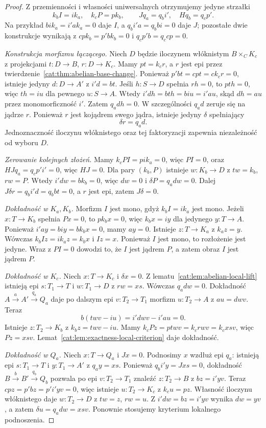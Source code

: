 \begin{proof}
Z przemienności i własności uniwersalnych otrzymujemy jedyne strzałki
\[
k_b I=i k_a,\quad k_c P=p k_b,\qquad
Jq_a=q_b i',\quad Hq_b=q_c p'.
\]
Na przykład $bi k_a=i'a k_a=0$ daje $I$, a $q_b i'a=q_b bi=0$ daje $J$; pozostałe dwie konstrukcje wynikają z $cp k_b=p'b k_b=0$ i $q_cp'b=q_ccp=0$.

\emph{Konstrukcja morfizmu łączącego.}
Niech $D$ będzie iloczynem włóknistym $B\times_C K_c$ z projekcjami $t:D\to B$, $r:D\to K_c$. Mamy $pt=k_cr$, a $r$ jest epi przez twierdzenie~\ref{cat:thm:abelian-base-change}. Ponieważ $p'bt=cpt=ck_cr=0$, istnieje jedyny $d:D\to A'$ z $i'd=bt$. Jeśli $h:S\to D$ spełnia $rh=0$, to $pth=0$, więc $th=iu$ dla pewnego $u:S\to A$. Wtedy $i'dh=bth=biu=i'au$, skąd $dh=au$ przez monomorficzność $i'$. Zatem $q_a dh=0$. W szczególności $q_a d$ zeruje się na jądrze $r$. Ponieważ $r$ jest kojądrem swego jądra, istnieje jedyny $\delta$ spełniający
\begin{equation}\label{cat:eq:snake-connecting}
\delta r=q_a d.
\end{equation}
Jednoznaczność iloczynu włóknistego oraz tej faktoryzacji zapewnia niezależność od wyboru $D$.

\emph{Zerowanie kolejnych złożeń.}
Mamy $k_cPI=pi k_a=0$, więc $PI=0$, oraz $HJq_a=q_c p'i'=0$, więc $HJ=0$. Dla pary $(k_b,P)$ istnieje $w:K_b\to D$ z $tw=k_b$, $rw=P$. Wtedy $i'dw=bk_b=0$, więc $dw=0$ i $\delta P=q_a dw=0$. Dalej $J\delta r=q_b i'd=q_bbt=0$, a $r$ jest epi, zatem $J\delta=0$.

\emph{Dokładność w $K_a,K_b$.}
Morfizm $I$ jest mono, gdyż $k_bI=ik_a$ jest mono. Jeżeli $x:T\to K_b$ spełnia $Px=0$, to $pk_bx=0$, więc $k_bx=iy$ dla jedynego $y:T\to A$. Ponieważ $i'ay=biy=bk_bx=0$, mamy $ay=0$. Istnieje $z:T\to K_a$ z $k_az=y$. Wówczas $k_bIz=ik_az=k_bx$ i $Iz=x$. Ponieważ $I$ jest mono, to rozłożenie jest jedyne. Wraz z $PI=0$ dowodzi to, że $I$ jest jądrem $P$, a zatem obraz $I$ jest jądrem $P$.

\emph{Dokładność w $K_c$.}
Niech $x:T\to K_c$ i $\delta x=0$. Z lematu~\ref{cat:lem:abelian-local-lift} istnieją epi $s:T_1\to T$ i $w:T_1\to D$ z $rw=xs$. Wówczas $q_a dw=0$. Dokładność $A\xrightarrow{a} A'\xrightarrow{q_a} Q_a$ daje po dalszym epi $v:T_2\to T_1$ morfizm $u:T_2\to A$ z $au=dwv$. Teraz
\[
 b(twv-iu)=i'dwv-i'au=0.
\]
Istnieje $z:T_2\to K_b$ z $k_bz=twv-iu$. Mamy $k_cPz=ptwv=k_crwv=k_cxsv$, więc $Pz=xsv$. Lemat~\ref{cat:lem:exactness-local-criterion} daje dokładność.

\emph{Dokładność w $Q_a$.}
Niech $x:T\to Q_a$ i $Jx=0$. Podnosimy $x$ wzdłuż epi $q_a$: istnieją epi $s:T_1\to T$ i $y:T_1\to A'$ z $q_ay=xs$. Ponieważ $q_b i'y=Jxs=0$, dokładność $B\xrightarrow b B'\xrightarrow{q_b}Q_b$ pozwala po epi $v:T_2\to T_1$ znaleźć $z:T_2\to B$ z $bz=i'yv$. Teraz $cpz=p'bz=p'i'yv=0$, więc istnieje $u:T_2\to K_c$ z $k_cu=pz$. Własność iloczynu włóknistego daje $w:T_2\to D$ z $tw=z$, $rw=u$. Z $i'dw=bz=i'yv$ wynika $dw=yv$, a zatem $\delta u=q_a dw=xsv$. Ponownie stosujemy kryterium lokalnego podnoszenia.


\end{proof}
